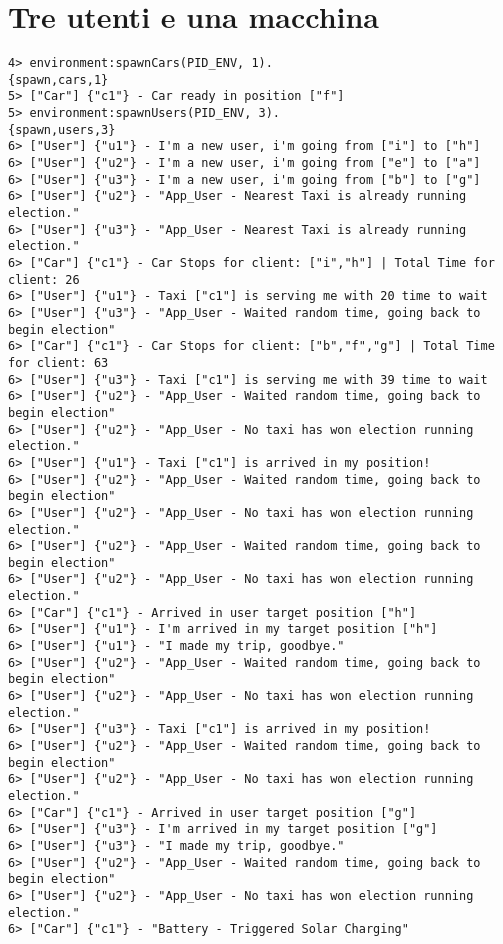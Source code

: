 \section{Tre utenti e una macchina} \label{tre_utenti_una_macchina_test}
\begin{lstlisting}
4> environment:spawnCars(PID_ENV, 1).
{spawn,cars,1}
5> ["Car"] {"c1"} - Car ready in position ["f"]
5> environment:spawnUsers(PID_ENV, 3).
{spawn,users,3}
6> ["User"] {"u1"} - I'm a new user, i'm going from ["i"] to ["h"]
6> ["User"] {"u2"} - I'm a new user, i'm going from ["e"] to ["a"]
6> ["User"] {"u3"} - I'm a new user, i'm going from ["b"] to ["g"]
6> ["User"] {"u2"} - "App_User - Nearest Taxi is already running election."
6> ["User"] {"u3"} - "App_User - Nearest Taxi is already running election."
6> ["Car"] {"c1"} - Car Stops for client: ["i","h"] | Total Time for client: 26
6> ["User"] {"u1"} - Taxi ["c1"] is serving me with 20 time to wait
6> ["User"] {"u3"} - "App_User - Waited random time, going back to begin election"
6> ["Car"] {"c1"} - Car Stops for client: ["b","f","g"] | Total Time for client: 63
6> ["User"] {"u3"} - Taxi ["c1"] is serving me with 39 time to wait
6> ["User"] {"u2"} - "App_User - Waited random time, going back to begin election"
6> ["User"] {"u2"} - "App_User - No taxi has won election running election."
6> ["User"] {"u1"} - Taxi ["c1"] is arrived in my position!
6> ["User"] {"u2"} - "App_User - Waited random time, going back to begin election"
6> ["User"] {"u2"} - "App_User - No taxi has won election running election."
6> ["User"] {"u2"} - "App_User - Waited random time, going back to begin election"
6> ["User"] {"u2"} - "App_User - No taxi has won election running election."
6> ["Car"] {"c1"} - Arrived in user target position ["h"]
6> ["User"] {"u1"} - I'm arrived in my target position ["h"]
6> ["User"] {"u1"} - "I made my trip, goodbye."
6> ["User"] {"u2"} - "App_User - Waited random time, going back to begin election"
6> ["User"] {"u2"} - "App_User - No taxi has won election running election."
6> ["User"] {"u3"} - Taxi ["c1"] is arrived in my position!
6> ["User"] {"u2"} - "App_User - Waited random time, going back to begin election"
6> ["User"] {"u2"} - "App_User - No taxi has won election running election."
6> ["Car"] {"c1"} - Arrived in user target position ["g"]
6> ["User"] {"u3"} - I'm arrived in my target position ["g"]
6> ["User"] {"u3"} - "I made my trip, goodbye."
6> ["User"] {"u2"} - "App_User - Waited random time, going back to begin election"
6> ["User"] {"u2"} - "App_User - No taxi has won election running election."
6> ["Car"] {"c1"} - "Battery - Triggered Solar Charging"

\end{lstlisting}
